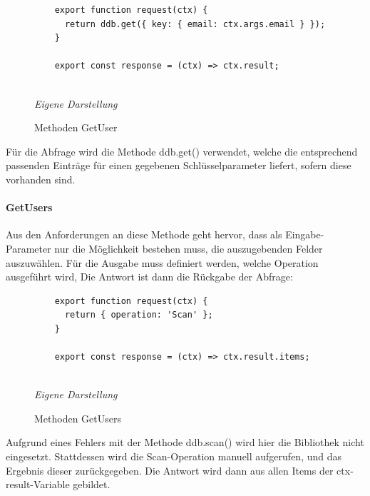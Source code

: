 	\begin{figure}[H]
	\centering
	\begin{minipage}[t]{.7\textwidth} %
	\caption{Methoden GetUser} %
	\begin{verbatim}
	export function request(ctx) {
	  return ddb.get({ key: { email: ctx.args.email } });
	}
	
	export const response = (ctx) => ctx.result;
	
	\end{verbatim}
	
	\textit{Eigene Darstellung} %
	\label{fig:getUserMethoden}
	\end{minipage}
	\end{figure}
Für die Abfrage wird die Methode ddb.get() verwendet, welche die entsprechend passenden Einträge für einen gegebenen Schlüsselparameter liefert, sofern diese vorhanden sind.
\paragraph{GetUsers}
Aus den Anforderungen an diese Methode geht hervor, dass als Eingabe-Parameter nur die Möglichkeit bestehen muss, die auszugebenden Felder auszuwählen. Für die Ausgabe muss definiert werden, welche Operation ausgeführt wird, \newpage Die Antwort ist dann die Rückgabe der Abfrage:\newline
	\begin{figure}[H]
	\centering
	\begin{minipage}[t]{.7\textwidth} %
	\caption{Methoden GetUsers} %
	\begin{verbatim}
	export function request(ctx) {
	  return { operation: 'Scan' };
	}
	
	export const response = (ctx) => ctx.result.items;
	
	\end{verbatim}
	
	\textit{Eigene Darstellung} %
	\label{fig:getUsersMethoden}
	\end{minipage}
	\end{figure}
Aufgrund eines Fehlers mit der Methode ddb.scan() wird hier die Bibliothek nicht eingesetzt. Stattdessen wird die Scan-Operation manuell aufgerufen, und das Ergebnis dieser zurückgegeben. Die Antwort wird dann aus allen Items der ctx-result-Variable gebildet.
